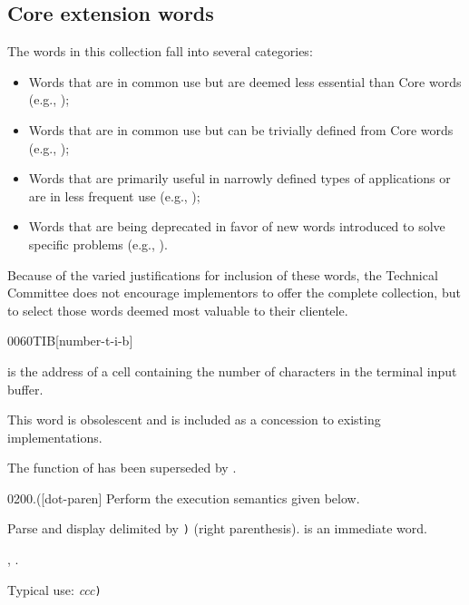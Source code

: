 \begin{intro}
\subsection{Core extension words} %

The words in this collection fall into several categories:

\begin{itemize}
\item Words that are in common use but are deemed less essential than
	Core words (e.g., );

\item Words that are in common use but can be trivially defined from
	Core words (e.g., );

\item Words that are primarily useful in narrowly defined types of
	applications or are in less frequent use (e.g., );

\item Words that are being deprecated in favor of new words introduced
	to solve specific problems (e.g., ).
\end{itemize}

Because of the varied justifications for inclusion of these words,
the Technical Committee does not encourage implementors to offer the
complete collection, but to select those words deemed most valuable to
their clientele.
\end{intro}


\begin{worddef}[numTIB]{0060}{\num{}TIB}[number-t-i-b]
\item {}

	 is the address of a cell containing the number
	of characters in the terminal input buffer.

\note
	This word is obsolescent and is included as a concession to
	existing implementations.

	\begin{defer}
	\rationale %
		The function of  has been superseded by
		.
	\end{defer}
\end{worddef}


\begin{worddef}[.p]{0200}{.(}[dot-paren]
\compile
	Perform the execution semantics given below.

\execute
	\stack{"ccc<paren>"}{}

	Parse and display  delimited by \texttt{)} (right
	parenthesis).  is an immediate word.

\see {},
	\wref{core:.q}{."}.

	\begin{defer}
	\rationale %
		Typical use:
			 \emph{ccc}\texttt{)}
	\end{defer}
\end{worddef}


